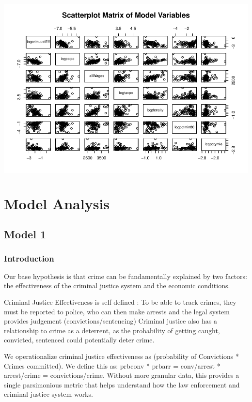 \documentclass[]{article}
\begin{document}
\includegraphics{Bagnard_Gaustad_Hartman_Leung_Lab_3_files/figure-latex/unnamed-chunk-63-1.pdf}

\hypertarget{model-analysis}{%
\section{Model Analysis}\label{model-analysis}}

\hypertarget{model-1}{%
\subsection{Model 1}\label{model-1}}

\hypertarget{introduction-1}{%
\subsubsection{Introduction}\label{introduction-1}}

Our base hypothesis is that crime can be fundamentally explained by two
factors: the effectiveness of the criminal justice system and the
economic conditions.

Criminal Justice Effectiveness is self defined : To be able to track
crimes, they must be reported to police, who can then make arrests and
the legal system provides judgement (convictions/sentencing) Criminal
justice also has a relationship to crime as a deterrent, as the
probability of getting caught, convicted, sentenced could potentially
deter crime.

We operationalize criminal justice effectiveness as (probability of
Convictions * Crimes committed). We define this as: prbconv * prbarr =
conv/arrest * arrest/crime = convictions/crime. Without more granular
data, this provides a single parsimonious metric that helps understand
how the law enforcement and criminal justice system works.
\end{document}
